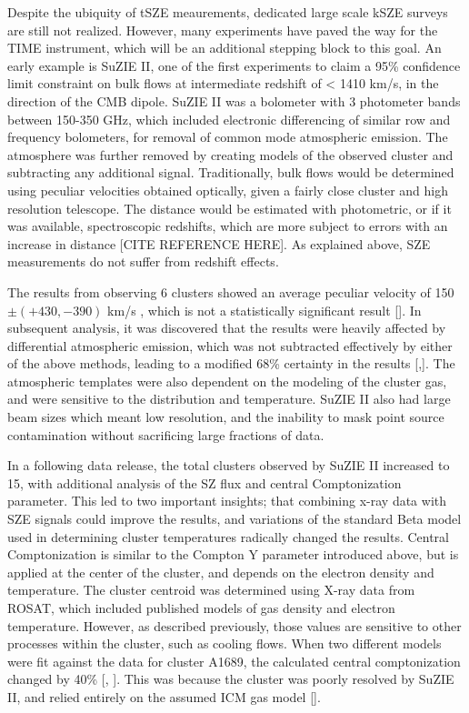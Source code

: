 \documentclass[manuscript]{aastex}
\begin{document}
Despite the ubiquity of tSZE meaurements, dedicated large scale kSZE surveys are still not realized. However, many experiments have paved the way for the TIME instrument, which will be an additional stepping block to this goal. An early example is SuZIE II, one of the first experiments to claim a 95\% confidence limit constraint on bulk flows at intermediate redshift of < 1410 km/s, in the direction of the CMB dipole. SuZIE II was a bolometer with 3 photometer bands between 150-350 GHz, which included electronic differencing of similar row and frequency bolometers, for removal of common mode atmospheric emission. The atmosphere was further removed by creating models of the observed cluster and subtracting any additional signal. Traditionally, bulk flows would be determined using peculiar velocities obtained optically, given a fairly close cluster and high resolution telescope. The distance would be estimated with photometric, or if it was available, spectroscopic redshifts, which are more subject to errors with an increase in distance [CITE REFERENCE HERE]. As explained above, SZE measurements do not suffer from redshift effects. 

The results from observing 6 clusters showed an average peculiar velocity of 150 $\pm (+430,-390)$ km/s , which is not a statistically significant result [\cite{Benson2003}]. In subsequent analysis, it was discovered that the results were heavily affected by differential atmospheric emission, which was not subtracted effectively by either of the above methods, leading to a modified 68\% certainty in the results [\cite{Mauskopf2000},\cite{Carlstrom2002}]. The atmospheric templates were also dependent on the modeling of the cluster gas, and were sensitive to the distribution and temperature. SuZIE II also had large beam sizes which meant low resolution, and the inability to mask point source contamination without sacrificing large fractions of data. 

In a following data release, the total clusters observed by SuZIE II increased to 15, with additional analysis of the SZ flux and central Comptonization parameter. This led to two important insights; that combining x-ray data with SZE signals could improve the results, and variations of the standard Beta model used in determining cluster temperatures radically changed the results. Central Comptonization is similar to the Compton Y parameter introduced above, but is applied at the center of the cluster, and depends on the electron density and temperature. The cluster centroid was determined using X-ray data from ROSAT, which included published models of gas density and electron temperature. However, as described previously, those values are sensitive to other processes within the cluster, such as cooling flows. When two different models were fit against the data for cluster A1689, the calculated central comptonization changed by 40\% [\cite{Holzapfel et al. 1997b}, \cite{Reese et al. 2002}]. This was because the cluster was poorly resolved by SuZIE II, and relied entirely on the assumed ICM gas model [\cite{Benson2004}]. 
\end{document}
